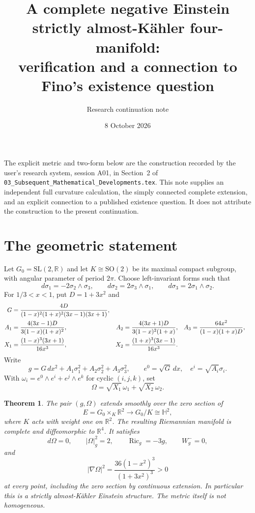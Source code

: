 \documentclass[11pt]{article}
\title{A complete negative Einstein strictly almost-K\"ahler four-manifold:\\verification and a connection to Fino's existence question}
\author{Research continuation note}
\date{8 October 2026}
\newtheorem{theorem}{Theorem}
\DeclareMathOperator{\Ric}{Ric}
\newcommand{\R}{\mathbb R}
\begin{document}
\maketitle

The explicit metric and two-form below are the construction recorded by
the user's research system, session A01, in Section~2 of
\texttt{03\_Subsequent\_Mathematical\_Developments.tex}.
This note supplies an independent full curvature calculation, the
simply connected complete extension, and an explicit connection to a
published existence question. It does not attribute the construction
to the present continuation.

\section{The geometric statement}

Let $G_0=\mathrm{SL}(2,\R)$ and let $K\cong\mathrm{SO}(2)$ be its
maximal compact subgroup, with angular parameter of period $2\pi$.
Choose left-invariant forms such that
\begin{equation}\label{eq:MC}
 d\sigma_1=-2\sigma_2\wedge\sigma_3,\qquad
 d\sigma_2=2\sigma_3\wedge\sigma_1,\qquad
 d\sigma_3=2\sigma_1\wedge\sigma_2.
\end{equation}
For $1/3<x<1$, put $D=1+3x^2$ and
\begin{align}
 G&=\frac{4D}{(1-x)^2(1+x)^2(3x-1)(3x+1)},\notag\\
 A_1&=\frac{4(3x-1)D}{3(1-x)(1+x)^2},&
 A_2&=\frac{4(3x+1)D}{3(1-x)^2(1+x)},&
 A_3&=\frac{64x^2}{(1-x)(1+x)D},\label{eq:metric-functions}\\
 X_1&=\frac{(1-x)^3(3x+1)}{16x^3},&
 X_2&=\frac{(1+x)^3(3x-1)}{16x^3}.\label{eq:X}
\end{align}
Write
\[
 g=G\,dx^2+A_1\sigma_1^2+A_2\sigma_2^2+A_3\sigma_3^2,
 \qquad e^0=\sqrt G\,dx,\quad e^i=\sqrt{A_i}\sigma_i.
\]
With $\omega_i=e^0\wedge e^i+e^j\wedge e^k$ for cyclic $(i,j,k)$, set
\begin{equation}\label{eq:Omega}
 \Omega=\sqrt{X_1}\,\omega_1+\sqrt{X_2}\,\omega_2.
\end{equation}

\begin{theorem}\label{thm:main}
The pair $(g,\Omega)$ extends smoothly over the zero section of
\[
 E=G_0\times_K\R^2\longrightarrow G_0/K\cong\mathbb H^2,
\]
where $K$ acts with weight one on $\R^2$. The resulting Riemannian
manifold is complete and diffeomorphic to $\R^4$. It satisfies
\[
 d\Omega=0,\qquad |\Omega|_g^2=2,\qquad
 \Ric_g=-3g,\qquad W_g^-=0,
\]
and
\begin{equation}\label{eq:q}
 |\nabla\Omega|^2=\frac{36(1-x^2)^3}{(1+3x^2)^3}>0
\end{equation}
at every point, including the zero section by continuous extension.
In particular this is a strictly almost-K\"ahler Einstein structure.
The metric itself is not homogeneous.
\end{theorem}
\end{document}

